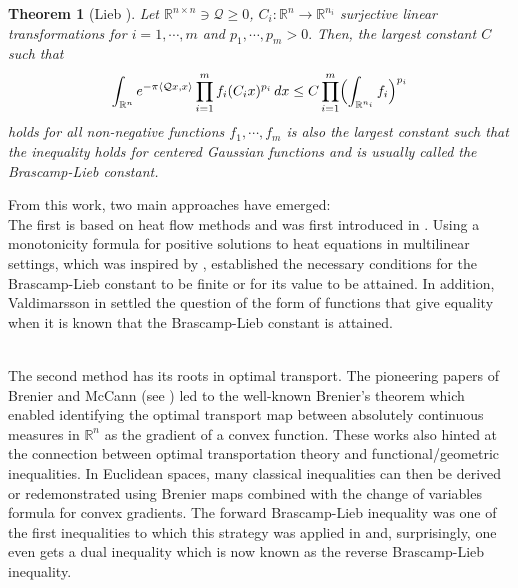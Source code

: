 \documentclass[11pt,a4paper,reqno]{amsart}
\numberwithin{equation}{section}
\newtheorem{theorem}{Theorem}[section]
\theoremstyle{definition}
\newcommand{\<}{\ensuremath \leq}
\renewcommand{\>}{\ensuremath \geq}
\begin{document}
\begin{theorem}[Lieb \cite{Lieb}]
    Let $\mathbb{R}^{n \times n} \ni \mathcal{Q} \geq 0$, $C_i: \mathbb{R}^n \rightarrow \mathbb{R}^{n_i}$ surjective linear transformations for $i=1,\cdots,m$ and $p_1,\cdots,p_m>0.$ Then, the largest constant $C$ such that $$\int_{\mathbb{R}^n}e^{-\pi \langle \mathcal{Q}x,x\rangle}\prod_{i=1}^mf_i(C_ix)^{p_i}\, dx \leq C\prod_{i=1}^m \Bigl( \int_{\mathbb{R}^{n_i}}f_i \Bigl)^{p_i}$$ holds for all non-negative functions $f_1,\cdots,f_m$ is also the largest constant such that the inequality holds for centered Gaussian functions and is usually called the Brascamp-Lieb constant.
\end{theorem}



From this work, two main approaches have emerged: \hfill \\

The first is based on heat flow methods and was first introduced in \cite{Carlen}. Using a monotonicity formula for positive solutions to heat equations in multilinear settings, which was inspired by \cite{Carlen}, \cite{BCCT} established the necessary conditions for the Brascamp-Lieb constant to be finite or for its value to be attained. In addition, Valdimarsson in \cite{Vald2} settled the question of the form of functions that give equality when it is known that the Brascamp-Lieb constant is attained.

\hfill \\

The second method has its roots in optimal transport. The pioneering papers of Brenier and McCann (see \cite{Brenier,MCann}) led to the well-known Brenier's theorem which enabled identifying the optimal transport map between absolutely continuous measures in $\mathbb{R}^n$ as the gradient of a convex function. These works also hinted at the connection between optimal transportation theory and functional/geometric inequalities. In Euclidean spaces, many classical inequalities can then be derived or redemonstrated using Brenier maps combined with the change of variables formula for convex gradients. The forward Brascamp-Lieb inequality was one of the first inequalities to which this strategy was applied in \cite{Barthe} and, surprisingly, one even gets a dual inequality which is now known as the reverse Brascamp-Lieb inequality. 
\end{document}
